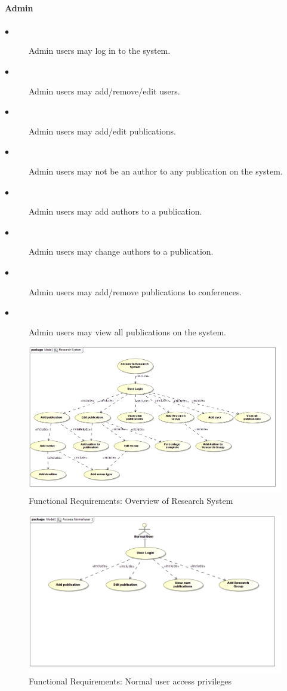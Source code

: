 \documentclass[a4paper]{article}
\begin{document}
	\paragraph{\textbf{Admin}}
	\begin{description}
		\item[$\bullet$] Admin users may log in to the system.
		\item[$\bullet$] Admin users may add/remove/edit users.
		\item[$\bullet$] Admin users may add/edit publications.
		\item[$\bullet$] Admin users may not be an author to any publication on the system.
		\item[$\bullet$] Admin users may add authors to a publication.
		\item[$\bullet$] Admin users may change authors to a publication.
		\item[$\bullet$] Admin users may add/remove publications to conferences.
		\item[$\bullet$] Admin users may view all publications on the system.
	\end{description}
	\begin{figure}[H]
		\includegraphics[width=\textwidth]{Overview.jpg}
		\caption{Functional Requirements: Overview of Research System \label{overflow}}
	\end{figure}
	\begin{figure}[H]
		\includegraphics[width=\textwidth]{AccessNormaluser.jpg}
		\caption{Functional Requirements: Normal user access privileges \label{overflow}}
	\end{figure}
\end{document}
